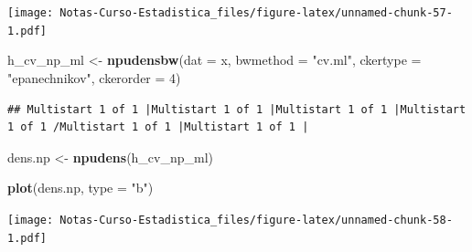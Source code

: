 \documentclass[
  12pt,
]{book}
\newenvironment{Shaded}{\begin{snugshade}}{\end{snugshade}}
\newcommand{\DataTypeTok}[1]{\textcolor[rgb]{0.13,0.29,0.53}{#1}}
\newcommand{\DecValTok}[1]{\textcolor[rgb]{0.00,0.00,0.81}{#1}}
\newcommand{\KeywordTok}[1]{\textcolor[rgb]{0.13,0.29,0.53}{\textbf{#1}}}
\newcommand{\NormalTok}[1]{#1}
\newcommand{\OperatorTok}[1]{\textcolor[rgb]{0.81,0.36,0.00}{\textbf{#1}}}
\newcommand{\StringTok}[1]{\textcolor[rgb]{0.31,0.60,0.02}{#1}}
\theoremstyle{definition}
\theoremstyle{definition}
\theoremstyle{definition}
\theoremstyle{remark}
\begin{document}
\texttt{[image: Notas-Curso-Estadistica\_files/figure-latex/unnamed-chunk-57-1.pdf]}

\begin{Shaded}
\begin{Highlighting}[]
\NormalTok{h_cv_np_ml <-}\StringTok{ }\KeywordTok{npudensbw}\NormalTok{(}\DataTypeTok{dat =}\NormalTok{ x, }\DataTypeTok{bwmethod =} \StringTok{"cv.ml"}\NormalTok{, }
    \DataTypeTok{ckertype =} \StringTok{"epanechnikov"}\NormalTok{, }\DataTypeTok{ckerorder =} \DecValTok{4}\NormalTok{)}
\end{Highlighting}
\end{Shaded}

\begin{verbatim}
## Multistart 1 of 1 |Multistart 1 of 1 |Multistart 1 of 1 |Multistart 1 of 1 /Multistart 1 of 1 |Multistart 1 of 1 |                   
\end{verbatim}

\begin{Shaded}
\begin{Highlighting}[]
\NormalTok{dens.np <-}\StringTok{ }\KeywordTok{npudens}\NormalTok{(h_cv_np_ml)}

\KeywordTok{plot}\NormalTok{(dens.np, }\DataTypeTok{type =} \StringTok{"b"}\NormalTok{)}
\end{Highlighting}
\end{Shaded}

\texttt{[image: Notas-Curso-Estadistica\_files/figure-latex/unnamed-chunk-58-1.pdf]}

\begin{Shaded}
\end{Shaded}
\end{document}
